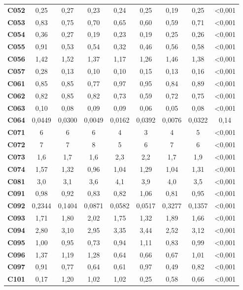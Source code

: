 \documentclass[
  12pt,
]{book}
\begin{document}
\begin{table}[!h]
{\begin{threeparttable}
\begin{tabular}[t]{lcccccccc}
\addlinespace
\textbf{C052} & 0,25 & 0,27 & 0,23 & 0,24 & 0,25 & 0,19 & 0,25 & <0,001\\
\textbf{C053} & 0,83 & 0,75 & 0,70 & 0,65 & 0,60 & 0,59 & 0,71 & <0,001\\
\textbf{C054} & 0,36 & 0,27 & 0,19 & 0,23 & 0,19 & 0,25 & 0,26 & <0,001\\
\textbf{C055} & 0,91 & 0,53 & 0,54 & 0,32 & 0,46 & 0,56 & 0,58 & <0,001\\
\textbf{C056} & 1,42 & 1,52 & 1,37 & 1,17 & 1,26 & 1,46 & 1,38 & <0,001\\
\addlinespace
\textbf{C057} & 0,28 & 0,13 & 0,10 & 0,10 & 0,15 & 0,13 & 0,16 & <0,001\\
\textbf{C061} & 0,85 & 0,85 & 0,77 & 0,97 & 0,95 & 0,84 & 0,89 & <0,001\\
\textbf{C062} & 0,82 & 0,85 & 0,82 & 0,73 & 0,59 & 0,72 & 0,75 & <0,001\\
\textbf{C063} & 0,10 & 0,08 & 0,09 & 0,09 & 0,06 & 0,05 & 0,08 & <0,001\\
\textbf{C064} & 0,0449 & 0,0300 & 0,0049 & 0,0162 & 0,0392 & 0,0076 & 0,0322 & 0,14\\
\addlinespace
\textbf{C071} & 6 & 6 & 6 & 4 & 3 & 4 & 5 & <0,001\\
\textbf{C072} & 7 & 7 & 8 & 5 & 6 & 7 & 6 & <0,001\\
\textbf{C073} & 1,6 & 1,7 & 1,6 & 2,3 & 2,2 & 1,7 & 1,9 & <0,001\\
\textbf{C074} & 1,57 & 1,32 & 0,96 & 1,04 & 1,29 & 1,04 & 1,31 & <0,001\\
\textbf{C081} & 3,0 & 3,1 & 3,6 & 4,1 & 3,9 & 4,0 & 3,5 & <0,001\\
\addlinespace
\textbf{C091} & 0,98 & 0,92 & 0,83 & 0,82 & 1,06 & 0,81 & 0,95 & <0,001\\
\textbf{C092} & 0,2344 & 0,1404 & 0,0871 & 0,0582 & 0,0517 & 0,3277 & 0,1357 & <0,001\\
\textbf{C093} & 1,71 & 1,80 & 2,02 & 1,75 & 1,32 & 1,89 & 1,66 & <0,001\\
\textbf{C094} & 2,80 & 3,10 & 2,95 & 3,35 & 3,44 & 2,52 & 3,12 & <0,001\\
\textbf{C095} & 1,00 & 0,95 & 0,73 & 0,94 & 1,11 & 0,83 & 0,99 & <0,001\\
\addlinespace
\textbf{C096} & 1,37 & 1,19 & 1,28 & 0,64 & 0,66 & 0,67 & 1,01 & <0,001\\
\textbf{C097} & 0,91 & 0,77 & 0,64 & 0,61 & 0,97 & 0,49 & 0,82 & <0,001\\
\textbf{C101} & 0,17 & 1,20 & 1,02 & 1,02 & 0,25 & 0,58 & 0,66 & <0,001\\

\end{tabular}
\end{threeparttable}}
\end{table}
\end{document}
